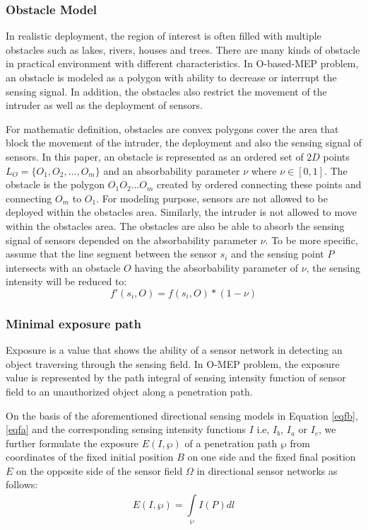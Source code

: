 \documentclass[final]{elsarticle}
\begin{document}
\subsubsection{Obstacle Model}
In realistic deployment, the region of interest is often filled with multiple obstacles such as lakes, rivers, houses and trees. There are many kinds of obstacle in practical environment with different characteristics. In O-based-MEP problem, an obstacle is modeled as a polygon with ability to decrease or interrupt the sensing signal. In addition, the obstacles also restrict the movement of the intruder as well as the deployment of sensors. 

For mathematic definition, obstacles are convex polygons cover the area that block the movement of the intruder, the deployment and also the sensing signal of sensors. In this paper, an obstacle is represented as an ordered set of $2D$ points $ L_O = \{O_1, O_2,\ldots,O_m\}$ and an absorbability parameter $\nu$ where $\nu \in [0,1]$. The obstacle is the polygon $O_1 O_2\ldots O_m $ created by ordered connecting these points and connecting $O_m$ to $O_1$. For modeling purpose, sensors are not allowed to be deployed within the obstacles area. Similarly, the intruder is not allowed to move within the obstacles area. The obstacles are also be able to absorb the sensing signal of sensors depended on the absorbability parameter $\nu$. To be more specific, assume that the line segment between the sensor $s_i$ and the sensing point $ P $ intersects with an obstacle $O$ having the absorbability parameter of $\nu$, the sensing intensity will be reduced to: 
\begin{equation}
\label{eqob}
f'(s_i,O) = f(s_i,O) * (1-\nu)
\end{equation}
\subsubsection{Minimal exposure path}
Exposure is a value that shows the ability of a sensor network in detecting an object traversing through the sensing field. In O-MEP problem, the exposure value is represented by the path integral of sensing intensity function of sensor field to an unauthorized object along a penetration path. 

On the basis of the aforementioned directional sensing models in Equation \eqref{eqfb}, \eqref{eqfa} and the corresponding sensing intensity functions $I$ i.e, $ I_b $, $ I_a $ or $ I_c $, we further formulate the exposure $ E(I,\wp )$ of a penetration path $ \wp $ from coordinates of the fixed initial position $ B $ on one side and the fixed final position $ E $ on the opposite side of the sensor field $ \Omega $ in directional sensor networks as follows:
\begin{equation}
\label{eqE}
E(I,\wp ) = \int\limits_{\wp }^{} {I(P)} dl
\end{equation}
\end{document}
